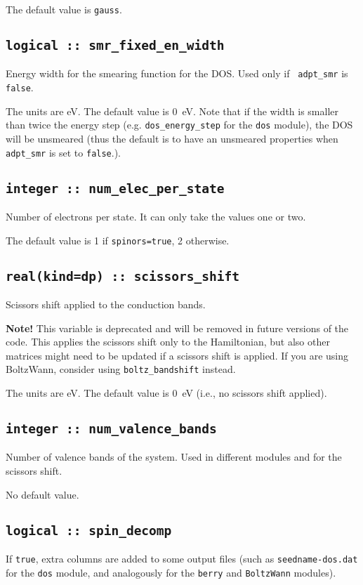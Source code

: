 The default value is {\tt gauss}.

\subsection[smr\_fixed\_en\_width]{\tt logical :: smr\_fixed\_en\_width}
Energy width for the smearing function for the DOS. Used only if {\tt
  adpt\_smr} is \verb#false#.

The units are eV. The default value is 0~eV. Note that if the width is
smaller than twice the energy step (e.g. {\tt dos\_energy\_step} for
the {\tt dos} module), the DOS
will be unsmeared (thus the default is to have an unsmeared
properties when {\tt  adpt\_smr} is set to \verb#false#.).


  \subsection{\tt integer :: num\_elec\_per\_state} 
Number of electrons per state. It can only take the values one or
two.

The default value is 1 if {\tt spinors=true}, 2 otherwise.

  \subsection{\tt real(kind=dp) :: scissors\_shift} 
Scissors shift applied to the conduction bands.

\textbf{Note!} This variable is deprecated and will be removed in future
versions of the code. This applies the scissors shift only to the Hamiltonian,
but also other matrices might need to be updated if a scissors shift is 
applied. If you are using BoltzWann, consider using \texttt{boltz\_bandshift} instead.

The units are eV. The default value is 0~eV (i.e., no scissors shift applied).

  \subsection{\tt integer :: num\_valence\_bands} 
Number of valence bands of the system. Used in different modules and
for the scissors shift.

No default value.


\subsection[spin\_decomp]{\tt logical :: spin\_decomp}
If {\tt true}, extra columns are added to some output files (such as
{\tt seedname-dos.dat} for the {\tt dos} module, and analogously for
the {\tt berry} and {\tt BoltzWann} modules).

